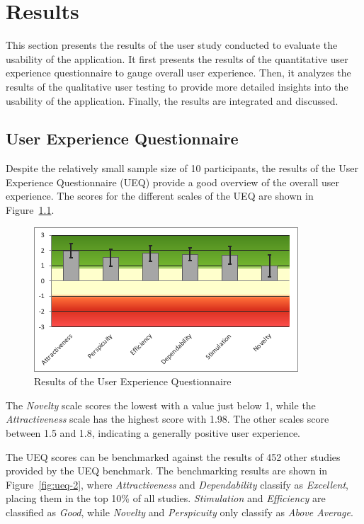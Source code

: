 %
\chapter{Results}
\label{sec:result}

This section presents the results of the user study conducted to evaluate the usability of the application.
It first presents the results of the quantitative user experience questionnaire to gauge overall user experience.
Then, it analyzes the results of the qualitative user testing to provide more detailed insights into the usability of the application.
Finally, the results are integrated and discussed.

\section{User Experience Questionnaire}
\label{sec:result:ux}

Despite the relatively small sample size of 10 participants, the results of the User Experience Questionnaire (UEQ) provide a good overview of the overall user experience.
The scores for the different scales of the UEQ are shown in Figure~\ref{fig:ueq-1}. 

\begin{figure}[htb]
  \centering
	\includegraphics[width=.7\textwidth]{figures/ueq-1.png}
	\caption{Results of the User Experience Questionnaire}
  \label{fig:ueq-1}
\end{figure}

The \emph{Novelty} scale scores the lowest with a value just below 1, while the \emph{Attractiveness} scale has the highest score with 1.98.
The other scales score between 1.5 and 1.8, indicating a generally positive user experience.

The UEQ scores can be benchmarked against the results of 452 other studies provided by the UEQ benchmark.
The benchmarking results are shown in Figure~\ref{fig:ueq-2}, where \emph{Attractiveness} and \emph{Dependability} classify as \emph{Excellent}, placing them in the top 10\% of all studies.
\emph{Stimulation} and \emph{Efficiency} are classified as \emph{Good}, while \emph{Novelty} and \emph{Perspicuity} only classify as \emph{Above Average}.


